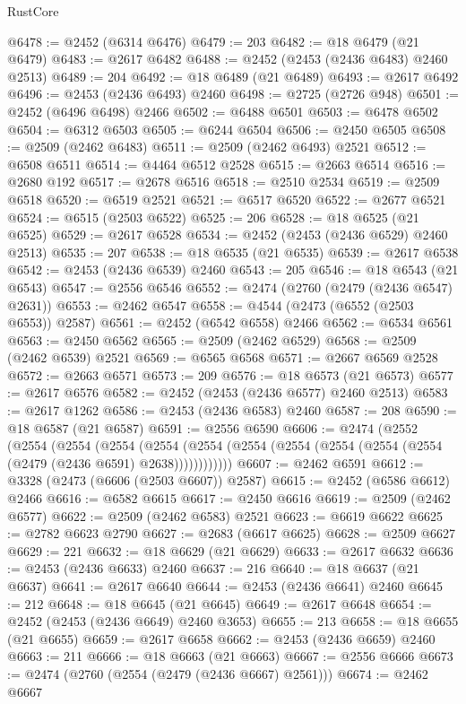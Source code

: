 \begin{lexlean}{RustCore}
\begin{coremodule}
@6478 := @2452 (@6314 @6476)
@6479 := 203
@6482 := @18 @6479 (@21 @6479)
@6483 := @2617 @6482
@6488 := @2452 (@2453 (@2436 @6483) @2460 @2513)
@6489 := 204
@6492 := @18 @6489 (@21 @6489)
@6493 := @2617 @6492
@6496 := @2453 (@2436 @6493) @2460
@6498 := @2725 (@2726 @948)
@6501 := @2452 (@6496 @6498) @2466
@6502 := @6488 @6501
@6503 := @6478 @6502
@6504 := @6312 @6503
@6505 := @6244 @6504
@6506 := @2450 @6505
@6508 := @2509 (@2462 @6483)
@6511 := @2509 (@2462 @6493) @2521
@6512 := @6508 @6511
@6514 := @4464 @6512 @2528
@6515 := @2663 @6514
@6516 := @2680 @192
@6517 := @2678 @6516
@6518 := @2510 @2534
@6519 := @2509 @6518
@6520 := @6519 @2521
@6521 := @6517 @6520
@6522 := @2677 @6521
@6524 := @6515 (@2503 @6522)
@6525 := 206
@6528 := @18 @6525 (@21 @6525)
@6529 := @2617 @6528
@6534 := @2452 (@2453 (@2436 @6529) @2460 @2513)
@6535 := 207
@6538 := @18 @6535 (@21 @6535)
@6539 := @2617 @6538
@6542 := @2453 (@2436 @6539) @2460
@6543 := 205
@6546 := @18 @6543 (@21 @6543)
@6547 := @2556 @6546
@6552 := @2474 (@2760 (@2479 (@2436 @6547) @2631))
@6553 := @2462 @6547
@6558 := @4544 (@2473 (@6552 (@2503 @6553)) @2587)
@6561 := @2452 (@6542 @6558) @2466
@6562 := @6534 @6561
@6563 := @2450 @6562
@6565 := @2509 (@2462 @6529)
@6568 := @2509 (@2462 @6539) @2521
@6569 := @6565 @6568
@6571 := @2667 @6569 @2528
@6572 := @2663 @6571
@6573 := 209
@6576 := @18 @6573 (@21 @6573)
@6577 := @2617 @6576
@6582 := @2452 (@2453 (@2436 @6577) @2460 @2513)
@6583 := @2617 @1262
@6586 := @2453 (@2436 @6583) @2460
@6587 := 208
@6590 := @18 @6587 (@21 @6587)
@6591 := @2556 @6590
@6606 := @2474
    (@2552
      (@2554
        (@2554
          (@2554
            (@2554 (@2554 (@2554 (@2554 (@2554 (@2554 (@2554 (@2479 (@2436 @6591) @2638))))))))))))
@6607 := @2462 @6591
@6612 := @3328 (@2473 (@6606 (@2503 @6607)) @2587)
@6615 := @2452 (@6586 @6612) @2466
@6616 := @6582 @6615
@6617 := @2450 @6616
@6619 := @2509 (@2462 @6577)
@6622 := @2509 (@2462 @6583) @2521
@6623 := @6619 @6622
@6625 := @2782 @6623 @2790
@6627 := @2683 (@6617 @6625)
@6628 := @2509 @6627
@6629 := 221
@6632 := @18 @6629 (@21 @6629)
@6633 := @2617 @6632
@6636 := @2453 (@2436 @6633) @2460
@6637 := 216
@6640 := @18 @6637 (@21 @6637)
@6641 := @2617 @6640
@6644 := @2453 (@2436 @6641) @2460
@6645 := 212
@6648 := @18 @6645 (@21 @6645)
@6649 := @2617 @6648
@6654 := @2452 (@2453 (@2436 @6649) @2460 @3653)
@6655 := 213
@6658 := @18 @6655 (@21 @6655)
@6659 := @2617 @6658
@6662 := @2453 (@2436 @6659) @2460
@6663 := 211
@6666 := @18 @6663 (@21 @6663)
@6667 := @2556 @6666
@6673 := @2474 (@2760 (@2554 (@2479 (@2436 @6667) @2561)))
@6674 := @2462 @6667

\end{coremodule}
\end{lexlean}

